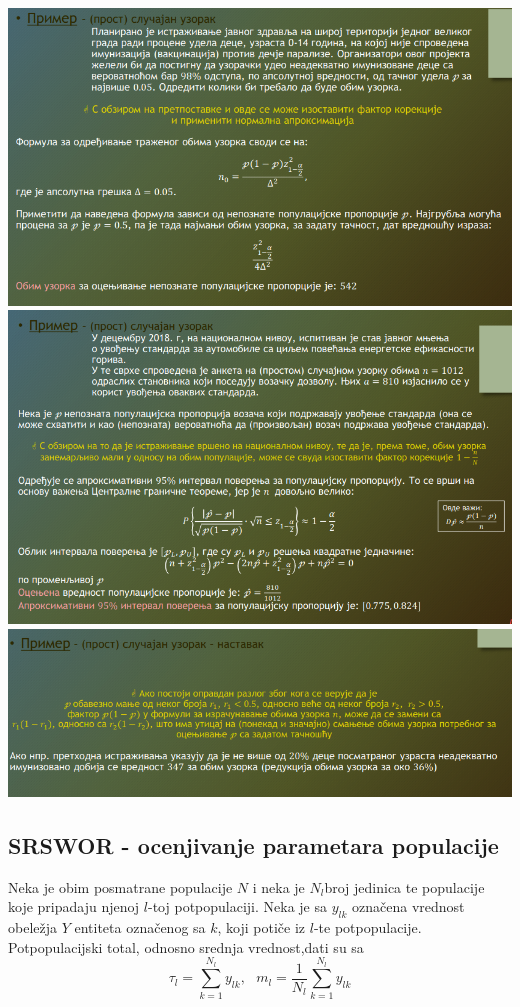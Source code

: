 \documentclass[10pt,a4paper,]{article}
\begin{document}
\includegraphics[scale=0.35]{nedelja_4_7.png}\\
\includegraphics[scale=0.35]{nedelja_4_8.png}\\
\includegraphics[scale=0.35]{nedelja_4_9.png}\\


\subsection{SRSWOR - ocenjivanje parametara populacije}
Neka je obim posmatrane populacije $N$ i neka je $N_l$broj jedinica te populacije koje pripadaju 
njenoj $l$-toj potpopulaciji. Neka je sa $y_{lk}$ označena vrednost obeležja $Y$ entiteta označenog sa $k$, 
koji potiče iz $l$-te potpopulacije. Potpopulacijski total, odnosno srednja vrednost,dati su 
sa
\begin{equation}
\tau_l = \sum_{k=1}^{N_l}y_{lk}, \text{                 }
 m_l = \frac{1}{N_l}\sum_{k=1}^{N_l}y_{lk}
\end{equation}
\end{document}
